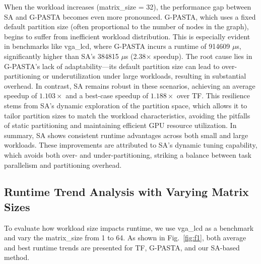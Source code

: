 \documentclass[9pt,conference]{IEEEtran}
\begin{document}
When the workload increases (matrix\_size = 32), the performance gap between SA and G-PASTA becomes even more pronounced. 
G-PASTA, which uses a fixed default partition size (often proportional to the number of nodes in the graph), begins to suffer from inefficient workload distribution. 
This is especially evident in benchmarks like vga\_lcd, where G-PASTA incurs a runtime of 914609 $\mu$s, significantly higher than SA’s 384815 $\mu$s (2.38$\times$ speedup). 
The root cause lies in G-PASTA's lack of adaptability—its default partition size can lead to over-partitioning or underutilization under large workloads, resulting in substantial overhead. 
In contrast, SA remains robust in these scenarios, achieving an average speedup of $1.103\times$ and a best-case speedup of $1.188\times$ over TF. 
This resilience stems from SA’s dynamic exploration of the partition space, which allows it to tailor partition sizes to match the workload characteristics, avoiding the pitfalls of static partitioning and maintaining efficient GPU resource utilization.
In summary, SA shows consistent runtime advantages across both small and large workloads. These improvements are attributed to SA’s dynamic tuning capability, which avoids both over- and under-partitioning, striking a balance between task parallelism and partitioning overhead.



\subsection{Runtime Trend Analysis with Varying Matrix Sizes}

To evaluate how workload size impacts runtime, we use vga\_lcd as a benchmark and vary the matrix\_size from 1 to 64. 
As shown in Fig.~\ref{fig:f1}, both average and best runtime trends are presented for TF, G-PASTA, and our SA-based method.
\end{document}
